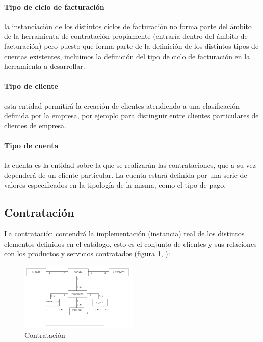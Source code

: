 \paragraph{Tipo de ciclo de facturación} la instanciación de los distintos ciclos de facturación no forma parte del ámbito de la herramienta de contratación propiamente (entraría dentro del ámbito de facturación) pero puesto que forma parte de la definición de los distintos tipos de cuentas existentes, incluimos la definición del tipo de ciclo de facturación en la herramienta a desarrollar.

\paragraph{Tipo de cliente} esta entidad permitirá la creación de clientes atendiendo a una clasificación definida por la empresa, por ejemplo para distinguir entre clientes particulares de clientes de empresa.

\paragraph{Tipo de cuenta} la cuenta es la entidad sobre la que se realizarán las contrataciones, que a su vez dependerá de un cliente particular. La cuenta estará definida por una serie de valores especificados en la tipología de la misma, como el tipo de pago.



\subsection{Contratación}
\label{sub:contratacion}
La contratación contendrá la implementación (instancia) real de los distintos elementos definidos en el catálogo, esto es el conjunto de clientes y sus relaciones con los productos y servicios contratados (figura \ref{fig:contratacion}, \pageref{fig:contratacion}):



\begin{figure}[hp!]
  \centering
  \includegraphics[width=0.50\textwidth]{imaxes/instancia.png}
  \caption{Contratación}
  \label{fig:contratacion}
\end{figure}


